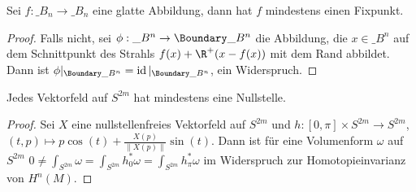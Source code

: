 \begin{st} \label{7.13}
    Sei $f: \_{B_n} \to \_{B_n}$ eine glatte Abbildung, dann hat $f$ mindestens einen Fixpunkt.
    \begin{proof}
        Falls nicht, sei $\phi: \_{B^n} \to \Boundary \_{B^n}$ die Abbildung, die $x \in \_{B^n}$ auf dem Schnittpunkt des Strahls $f(x) + \R^+ (x - f(x))$ mit dem Rand abbildet.
        Dann ist $\phi|_{\Boundary \_{B^n}} = \id|_{\Boundary \_{B^n}}$, ein Widerspruch.
    \end{proof}
\end{st}

\begin{st} \label{7.14}
    Jedes Vektorfeld auf $S^{2m}$ hat mindestens eine Nullstelle.
    \begin{proof}
        Sei $X$ eine nullstellenfreies Vektorfeld auf $S^{2m}$ und $h: [0, \pi] \times S^{2m} \to S^{2m}$,
        \begin{math}
            (t,p) \mapsto p \cos(t) + \frac{X(p)}{\|X(p)\|} \sin(t).
        \end{math}
        Dann ist für eine Volumenform $\omega$ auf $S^{2m}$
        \begin{math}
            0 \neq \int_{S^{2m}} \omega
            = \int_{S^{2m}} h_0^* \omega
            = \int_{S^{2m}} h_\pi^* \omega
        \end{math}
        im Widerspruch zur Homotopieinvarianz von $H^n(M)$.
    \end{proof}
\end{st}


